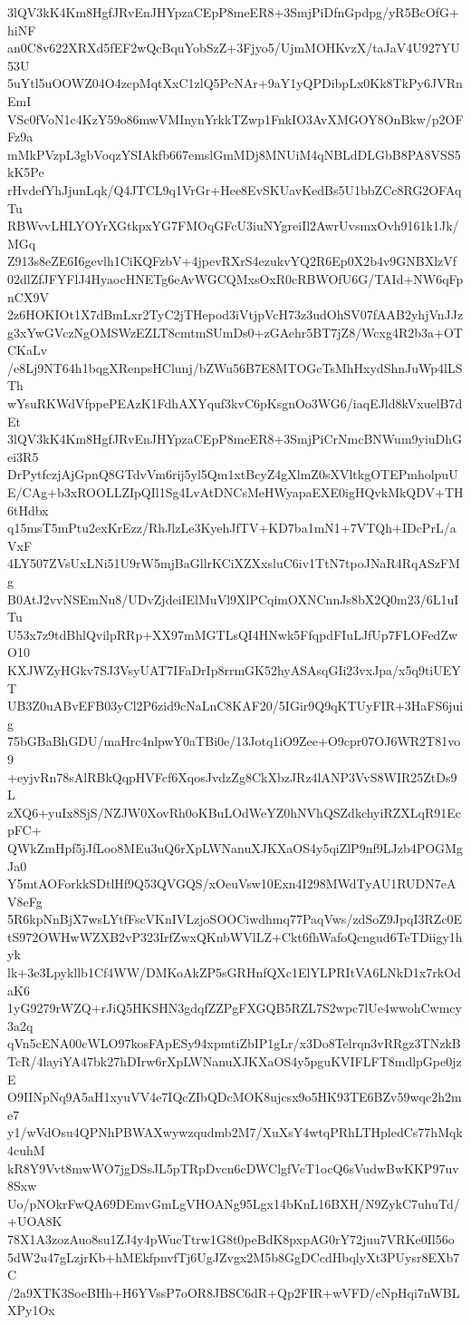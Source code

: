 3lQV3kK4Km8HgfJRvEnJHYpzaCEpP8meER8+3SmjPiDfnGpdpg/yR5BcOfG+hiNF
an0C8v622XRXd5fEF2wQcBquYobSzZ+3Fjyo5/UjmMOHKvzX/taJaV4U927YU53U
5uYtl5uOOWZ04O4zcpMqtXxC1zlQ5PcNAr+9aY1yQPDibpLx0Kk8TkPy6JVRnEmI
VSc0fVoN1c4KzY59o86mwVMInynYrkkTZwp1FnkIO3AvXMGOY8OnBkw/p2OFFz9a
mMkPVzpL3gbVoqzYSIAkfb667emslGmMDj8MNUiM4qNBLdDLGbB8PA8VSS5kK5Pe
rHvdefYhJjunLqk/Q4JTCL9q1VrGr+Hee8EvSKUavKedBs5U1bbZCc8RG2OFAqTu
RBWvvLHLYOYrXGtkpxYG7FMOqGFcU3iuNYgreiIl2AwrUvsmxOvh9161k1Jk/MGq
Z913s8eZE6I6gevlh1CiKQFzbV+4jpevRXrS4ezukvYQ2R6Ep0X2b4v9GNBXlzVf
02dlZfJFYFlJ4HyaocHNETg6eAvWGCQMxsOxR0cRBWOfU6G/TAId+NW6qFpnCX9V
2z6HOKIOt1X7dBmLxr2TyC2jTHepod3iVtjpVcH73z3udOhSV07fAAB2yhjVnJJz
g3xYwGVczNgOMSWzEZLT8cmtmSUmDs0+zGAehr5BT7jZ8/Wcxg4R2b3a+OTCKaLv
/e8Lj9NT64h1bqgXRenpsHClunj/bZWu56B7E8MTOGcTsMhHxydShnJuWp4lLSTh
wYsuRKWdVfppePEAzK1FdhAXYquf3kvC6pKsgnOo3WG6/iaqEJld8kVxuelB7dEt
3lQV3kK4Km8HgfJRvEnJHYpzaCEpP8meER8+3SmjPiCrNmcBNWum9yiuDhGei3R5
DrPytfczjAjGpnQ8GTdvVm6rij5yl5Qm1xtBcyZ4gXlmZ0sXVltkgOTEPmholpuU
E/CAg+b3xROOLLZIpQIl1Sg4LvAtDNCsMeHWyapaEXE0igHQvkMkQDV+TH6tHdbx
q15msT5mPtu2exKrEzz/RhJlzLe3KyehJfTV+KD7ba1mN1+7VTQh+IDcPrL/aVxF
4LY507ZVsUxLNi51U9rW5mjBaGllrKCiXZXxsluC6iv1TtN7tpoJNaR4RqASzFMg
B0AtJ2vvNSEmNu8/UDvZjdeiIElMuVl9XlPCqimOXNCnnJs8bX2Q0m23/6L1uITu
U53x7z9tdBhlQvilpRRp+XX97mMGTLsQI4HNwk5FfqpdFIuLJfUp7FLOFedZwO10
KXJWZyHGkv7SJ3VsyUAT7IFaDrIp8rrmGK52hyASAsqGIi23vxJpa/x5q9tiUEYT
UB3Z0uABvEFB03yCl2P6zid9cNaLnC8KAF20/5IGir9Q9qKTUyFIR+3HaFS6juig
75bGBaBhGDU/maHrc4nlpwY0aTBi0e/13Jotq1iO9Zee+O9cpr07OJ6WR2T81vo9
+eyjvRn78sAlRBkQqpHVFcf6XqosJvdzZg8CkXbzJRz4lANP3VvS8WIR25ZtDs9L
zXQ6+yuIx8SjS/NZJW0XovRh0oKBuLOdWeYZ0hNVhQSZdkchyiRZXLqR91EcpFC+
QWkZmHpf5jJfLoo8MEu3uQ6rXpLWNanuXJKXaOS4y5qiZlP9nf9LJzb4POGMgJa0
Y5mtAOForkkSDtlHf9Q53QVGQS/xOeuVsw10Exn4I298MWdTyAU1RUDN7eAV8eFg
5R6kpNnBjX7wsLYtfFscVKnIVLzjoSOOCiwdhmq77PaqVws/zdSoZ9JpqI3RZc0E
tS972OWHwWZXB2vP323IrfZwxQKnbWVlLZ+Ckt6fhWafoQcngud6TeTDiigy1hyk
lk+3e3Lpykllb1Cf4WW/DMKoAkZP5sGRHnfQXc1ElYLPRItVA6LNkD1x7rkOdaK6
1yG9279rWZQ+rJiQ5HKSHN3gdqfZZPgFXGQB5RZL7S2wpc7lUe4wwohCwmcy3a2q
qVn5cENA00cWLO97kosFApESy94xpmtiZbIP1gLr/x3Do8Telrqn3vRRgz3TNzkB
TcR/4layiYA47bk27hDIrw6rXpLWNanuXJKXaOS4y5pguKVIFLFT8mdlpGpe0jzE
O9IINpNq9A5aH1xyuVV4e7IQcZIbQDcMOK8ujcsx9o5HK93TE6BZv59wqc2h2me7
y1/wVdOsu4QPNhPBWAXwywzqudmb2M7/XuXsY4wtqPRhLTHpledCs77hMqk4cuhM
kR8Y9Vvt8mwWO7jgDSsJL5pTRpDvcn6cDWClgfVcT1ocQ6sVudwBwKKP97uv8Sxw
Uo/pNOkrFwQA69DEmvGmLgVHOANg95Lgx14bKnL16BXH/N9ZykC7uhuTd/+UOA8K
78X1A3zozAuo8su1ZJ4y4pWucTtrw1G8t0peBdK8pxpAG0rY72juu7VRKe0Il56o
5dW2u47gLzjrKb+hMEkfpnvfTj6UgJZvgx2M5b8GgDCcdHbqlyXt3PUysr8EXb7C
/2a9XTK3SoeBHh+H6YVssP7oOR8JBSC6dR+Qp2FIR+wVFD/cNpHqi7nWBLXPy1Ox

